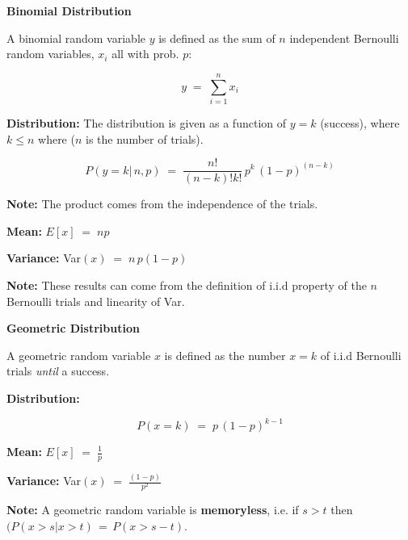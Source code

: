 \documentclass[10pt]{article}
\numberwithin{equation}{section}
\begin{document}
 \noindent
\textbf{Binomial Distribution}

\noindent
A binomial random variable $y$ is defined as the sum of $n$ independent Bernoulli random variables, $x_{i}$ all with prob. $p$:

$$ y  \; = \; \sum_{i=1}^{n} x_{i}$$
 
 \noindent
 \textbf{Distribution:}  The distribution is given as a function of $y=k$ (success), where $k \leq n$ where ($n$ is the number of trials).  
 
 \begin{equation}
 P(y = k | \, n, p ) \; = \; \frac{n!}{(n-k)! k! } \, p^{k}  \, (1-p)^{(n-k)}
 \end{equation}
 
 \noindent
 \textbf{Note:}  The product comes from the independence of the trials.
 
\vspace{1mm}
 
 \noindent
 \textbf{Mean:} $E[x] \; = \;  np$
 
  \noindent
 \textbf{Variance:}  Var$(x) \; = \;  n \, p(1-p)$
 
\vspace{1mm}
 
 \noindent
 \textbf{Note:} These results can come from the definition of i.i.d property of the $n$ Bernoulli trials and linearity of Var.
 
 
 \vspace{3mm}
 
 \noindent
\textbf{Geometric Distribution}

\noindent
A geometric random variable $x$ is defined as the number $x=k$ of i.i.d Bernoulli trials \textit{until} a success.

\vspace{1mm}

 \noindent
 \textbf{Distribution:}  
 
 \begin{equation}
 P(x=k) \; = \; p \, (1-p)^{k-1}
 \end{equation}
 
 
 \vspace{1mm} 

\noindent
\textbf{Mean:} $E[x] \; = \;  \frac{1}{p} $
 
\noindent
\textbf{Variance:}  Var$(x) \; = \;  \frac{(1-p)}{p^{2}}$

\vspace{1mm}
 
 \noindent
 \textbf{Note:} A geometric random variable is \textbf{memoryless}, i.e. if $s > t$ then $(P(x > s | x > t) \, = \, P(x > s - t)$.
 
\end{document}
